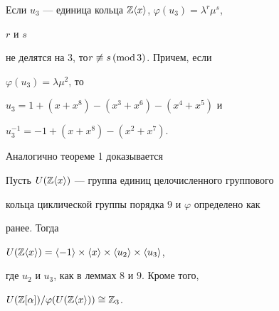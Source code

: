 


\begin{lem} 


Если $u_3$ --- единица кольца $\Bbb Z\langle x\rangle$, $\varphi(u_3)=\lambda^r\mu^s$, 


$r$ и $s$ 


не делятся на $3$, то\linebreak $r\not\equiv s\,(\operatorname{mod} 3)$. Причем, если 


$\varphi(u_3)=\lambda\mu^2$, то 


$u_3=1+(x+x^8)-(x^3+x^6)-(x^4+x^5)$ и 


$u^{-1}_3=-1+(x+x^8)-(x^2+x^7)$. 


\end{lem} 


 


Аналогично теореме 1 доказывается 


 


\begin{thm} 


Пусть $U(\Bbb Z\langle x\rangle)$ --- группа единиц целочисленного группового 


кольца циклической группы порядка $9$ и $\varphi$ определено как 


ранее. Тогда 


$U(\Bbb Z\langle x\rangle)=\langle-1\rangle\times\langle x\rangle\times\langle u_2\rangle\times\langle u_3\rangle$, 


где $u_2$ и $u_3$, как в леммах $8$ и $9$. Кроме того, 


$U(\Bbb Z[\alpha])/\varphi(U(\Bbb Z\langle x\rangle))\cong\Bbb Z_3$. 


\end{thm} 


 


